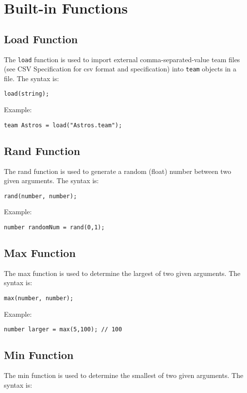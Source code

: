 
\section{Built-in Functions}

\subsection{Load Function}
The \texttt{load} function is used to import external
comma-separated-value team files (see CSV Specification for csv format
and specification) into \texttt{team} objects in a file. The syntax
is:

\begin{verbatim}
load(string);
\end{verbatim}
Example: 
\begin{verbatim}
team Astros = load("Astros.team");
\end{verbatim}

\subsection{Rand Function}
The rand function is used to generate a random (float) number between
two given arguments. The syntax is:

\begin{verbatim}
rand(number, number);
\end{verbatim}
Example: 
\begin{verbatim}
number randomNum = rand(0,1);
\end{verbatim}

\subsection{Max Function}
The max function is used to determine the largest of two given
arguments. The syntax is:

\begin{verbatim}
max(number, number);
\end{verbatim}
Example: 
\begin{verbatim}
number larger = max(5,100); // 100
\end{verbatim}
 
\subsection{Min Function}
The min function is used to determine the smallest of two given arguments. The syntax is:

